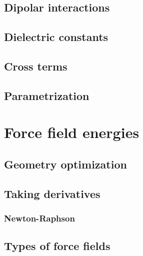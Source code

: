 	\subsection{Dipolar interactions}

	\subsection{Dielectric constants}

	\subsection{Cross terms}

	\subsection{Parametrization}

\section{Force field energies}

	\subsection{Geometry optimization}

	\subsection{Taking derivatives}

		\subsubsection{Newton-Raphson}

	\subsection{Types of force fields}
